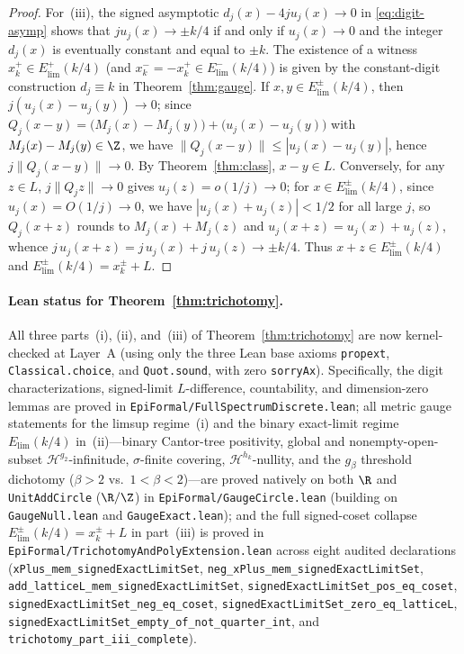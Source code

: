 \begin{proof}
For~(iii), the signed asymptotic $d_j(x)-4ju_j(x)\to0$ in
\eqref{eq:digit-asymp} shows that $ju_j(x)\to\pm k/4$ if and only if
$u_j(x)\to0$ and the integer $d_j(x)$ is eventually constant and equal to
$\pm k$. The existence of a witness $x_k^+\in E_{\mathrm{lim}}^+(k/4)$ (and
$x_k^-=-x_k^+\in E_{\mathrm{lim}}^-(k/4)$) is given by the constant-digit
construction $d_j\equiv k$ in Theorem~\ref{thm:gauge}. If
$x,y\in E_{\mathrm{lim}}^\pm(k/4)$, then $j(u_j(x)-u_j(y))\to0$; since
$Q_j(x-y)=\bigl(M_j(x)-M_j(y)\bigr)+\bigl(u_j(x)-u_j(y)\bigr)$ with
$M_j(x)-M_j(y)\in\Z$, we have $\|Q_j(x-y)\|\le|u_j(x)-u_j(y)|$, hence
$j\|Q_j(x-y)\|\to0$. By Theorem~\ref{thm:class}, $x-y\in L$. Conversely, for
any $z\in L$, $j\|Q_jz\|\to0$ gives $u_j(z)=o(1/j)\to0$; for
$x\in E_{\mathrm{lim}}^\pm(k/4)$, since $u_j(x)=O(1/j)\to0$, we have
$|u_j(x)+u_j(z)|<1/2$ for all large $j$, so $Q_j(x+z)$ rounds to
$M_j(x)+M_j(z)$ and $u_j(x+z)=u_j(x)+u_j(z)$, whence
$j\,u_j(x+z)=j\,u_j(x)+j\,u_j(z)\to\pm k/4$. Thus $x+z\in E_{\mathrm{lim}}^\pm(k/4)$
and $E_{\mathrm{lim}}^\pm(k/4)=x_k^\pm+L$.
\end{proof}

\paragraph{Lean status for Theorem~\ref{thm:trichotomy}.}
All three parts~(i), (ii), and~(iii) of Theorem~\ref{thm:trichotomy} are now
kernel-checked at Layer~A (using only the three Lean base axioms
\texttt{propext}, \texttt{Classical.choice}, and \texttt{Quot.sound}, with zero
\texttt{sorryAx}). Specifically, the digit characterizations, signed-limit
$L$-difference, countability, and dimension-zero lemmas are proved in
\texttt{EpiFormal/\allowbreak Full\allowbreak Spectrum\allowbreak Discrete.lean};
all metric gauge statements for the limsup regime~(i) and the binary exact-limit
regime $E_{\mathrm{lim}}(k/4)$ in~(ii)---binary Cantor-tree positivity, global
and nonempty-open-subset $\mathcal H^{g_2}$-infinitude, $\sigma$-finite
covering, $\mathcal H^{h_k}$-nullity, and the $g_\beta$ threshold dichotomy
($\beta>2$ vs.\ $1<\beta<2$)---are proved natively on both $\R$ and
\texttt{UnitAddCircle} ($\R/\Z$) in
\texttt{EpiFormal/\allowbreak GaugeCircle.lean} (building on
\texttt{GaugeNull.lean} and \texttt{GaugeExact.lean}); and the full
signed-coset collapse $E_{\mathrm{lim}}^\pm(k/4)=x_k^\pm+L$ in part~(iii) is
proved in
\texttt{EpiFormal/\allowbreak TrichotomyAndPolyExtension.lean} across eight
audited declarations (\texttt{xPlus\_\allowbreak mem\_\allowbreak signedExactLimitSet},
\texttt{neg\_\allowbreak xPlus\_\allowbreak mem\_\allowbreak signedExactLimitSet},
\texttt{add\_\allowbreak latticeL\_\allowbreak mem\_\allowbreak signedExactLimitSet},
\texttt{signedExactLimitSet\_\allowbreak pos\_\allowbreak eq\_\allowbreak coset},
\texttt{signedExactLimitSet\_\allowbreak neg\_\allowbreak eq\_\allowbreak coset},
\texttt{signedExactLimitSet\_\allowbreak zero\_\allowbreak eq\_\allowbreak latticeL},
\texttt{signedExactLimitSet\_\allowbreak empty\_\allowbreak of\_\allowbreak not\_\allowbreak quarter\_\allowbreak int},
and \texttt{trichotomy\_\allowbreak part\_\allowbreak iii\_\allowbreak complete}).

